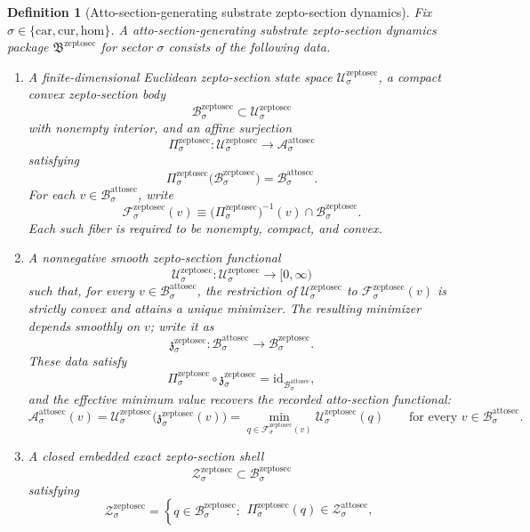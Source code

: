 \documentclass[11pt]{article}
\newcommand{\Car}{\mathrm{car}}
\newcommand{\Cur}{\mathrm{cur}}
\newcommand{\Hom}{\mathrm{hom}}
\newcommand{\AttoSectionSpace}[1]{\mathcal A_{#1}^{\mathrm{attosec}}}
\newcommand{\AttoSectionBody}[1]{\mathcal B_{#1}^{\mathrm{attosec}}}
\newcommand{\AttoSectionFunctional}[1]{\mathscr A_{#1}^{\mathrm{attosec}}}
\newcommand{\AttoSectionShell}[1]{\mathcal Z_{#1}^{\mathrm{attosec}}}
\newcommand{\ZeptoSectionPackage}{\mathfrak B^{\mathrm{zeptosec}}}
\newcommand{\ZeptoSectionSpace}[1]{\mathcal U_{#1}^{\mathrm{zeptosec}}}
\newcommand{\ZeptoSectionBody}[1]{\mathcal B_{#1}^{\mathrm{zeptosec}}}
\newcommand{\ZeptoSectionProj}[1]{\Pi_{#1}^{\mathrm{zeptosec}}}
\newcommand{\ZeptoSectionFiber}[2]{\mathcal F_{#1}^{\mathrm{zeptosec}}(#2)}
\newcommand{\ZeptoSectionAttoMin}[1]{\mathfrak z_{#1}^{\mathrm{zeptosec}}}
\newcommand{\ZeptoSectionFunctional}[1]{\mathscr U_{#1}^{\mathrm{zeptosec}}}
\newcommand{\ZeptoSectionShell}[1]{\mathcal Z_{#1}^{\mathrm{zeptosec}}}
\newtheorem{definition}{Definition}
\begin{document}
\begin{definition}[Atto-section-generating substrate zepto-section dynamics]
\label{def:zeptosec}
Fix \(\sigma\in\{\Car,\Cur,\Hom\}\). A \emph{atto-section-generating substrate zepto-section dynamics package} \(\ZeptoSectionPackage\) for sector \(\sigma\) consists of the following data.
\begin{enumerate}
    \item A finite-dimensional Euclidean zepto-section state space \(\ZeptoSectionSpace{\sigma}\), a compact convex zepto-section body
    \[
    \ZeptoSectionBody{\sigma}\subset\ZeptoSectionSpace{\sigma}
    \]
    with nonempty interior, and an affine surjection
    \[
    \ZeptoSectionProj{\sigma}:\ZeptoSectionSpace{\sigma}\to\AttoSectionSpace{\sigma}
    \]
    satisfying
    \[
    \ZeptoSectionProj{\sigma}\bigl(\ZeptoSectionBody{\sigma}\bigr)=\AttoSectionBody{\sigma}.
    \]
    For each \(v\in\AttoSectionBody{\sigma}\), write
    \[
    \ZeptoSectionFiber{\sigma}{v}
    \equiv
    \bigl(\ZeptoSectionProj{\sigma}\bigr)^{-1}(v)\cap\ZeptoSectionBody{\sigma}.
    \]
    Each such fiber is required to be nonempty, compact, and convex.
    \item A nonnegative smooth zepto-section functional
    \[
    \ZeptoSectionFunctional{\sigma}:\ZeptoSectionSpace{\sigma}\to[0,\infty)
    \]
    such that, for every \(v\in\AttoSectionBody{\sigma}\), the restriction of \(\ZeptoSectionFunctional{\sigma}\) to \(\ZeptoSectionFiber{\sigma}{v}\) is strictly convex and attains a unique minimizer. The resulting minimizer depends smoothly on \(v\); write it as
    \[
    \ZeptoSectionAttoMin{\sigma}:\AttoSectionBody{\sigma}\to\ZeptoSectionBody{\sigma}.
    \]
    These data satisfy
    \[
    \ZeptoSectionProj{\sigma}\circ\ZeptoSectionAttoMin{\sigma}
    =
    \mathrm{id}_{\AttoSectionBody{\sigma}},
    \]
    and the effective minimum value recovers the recorded atto-section functional:
    \[
    \AttoSectionFunctional{\sigma}(v)
    =
    \ZeptoSectionFunctional{\sigma}\bigl(\ZeptoSectionAttoMin{\sigma}(v)\bigr)
    =
    \min_{q\in\ZeptoSectionFiber{\sigma}{v}}
    \ZeptoSectionFunctional{\sigma}(q)
    \qquad
    \text{for every }
    v\in\AttoSectionBody{\sigma}.
    \]
    \item A closed embedded exact zepto-section shell
    \[
    \ZeptoSectionShell{\sigma}\subset\ZeptoSectionBody{\sigma}
    \]
    satisfying
    \[
    \ZeptoSectionShell{\sigma}
    =
    \left\{
    q\in\ZeptoSectionBody{\sigma}:
    \begin{array}{l}
    \ZeptoSectionProj{\sigma}(q)\in\AttoSectionShell{\sigma},\\[0.2em]

\end{array}\]
\end{enumerate}
\end{definition}
\end{document}
